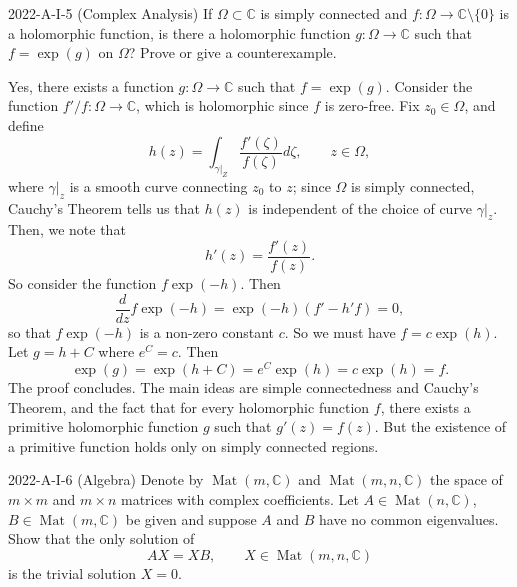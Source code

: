 \documentclass{article}
\begin{document}
\begin{prb}{2022-A-I-5 (Complex Analysis)}
	If $\Omega \subset \mathbb{C}$ is simply connected and $f: \Omega \to \mathbb{C}\setminus \{0\}$ is a holomorphic function, is there a holomorphic function $g: \Omega \to \mathbb{C}$ such that $f = \exp(g)$ on $\Omega$? Prove or give a counterexample. 
\end{prb}
\begin{solutions}
	Yes, there exists a function $g: \Omega \to \mathbb{C}$ such that $f = \exp(g)$. Consider the function $f'/f: \Omega \to \mathbb{C}$, which is holomorphic since $f$ is zero-free. Fix $z_{0} \in \Omega$, and define 
		\begin{equation}
			h(z) = \int_{\gamma|_{Z}}\frac{f'(\zeta)}{f(\zeta)}d\zeta, \qquad z \in \Omega, 
		\end{equation}
	where $\gamma|_{z}$ is a smooth curve connecting $z_{0}$ to $z$; since $\Omega$ is simply connected, Cauchy's Theorem tells us that $h(z)$ is independent of the choice of curve $\gamma|_{z}$. Then, we note that 
		\begin{equation}
			h'(z) = \frac{f'(z)}{f(z)}. 
		\end{equation}
	So consider the function $f\exp(-h)$. Then 
		\begin{equation}
			\frac{d}{dz}f\exp(-h) = \exp(-h)(f' - h'f) = 0, 
		\end{equation}
	so that $f\exp(-h)$ is a non-zero constant $c$. So we must have $f = c\exp(h)$. Let $g = h + C$ where $e^{C} = c$. Then 
		\begin{equation}
			\exp(g) = \exp(h + C) = e^{C}\exp(h) = c\exp(h) = f. 
		\end{equation}
	The proof concludes. The main ideas are simple connectedness and Cauchy's Theorem, and the fact that for every holomorphic function $f$, there exists a primitive holomorphic function $g$ such that $g'(z) = f(z)$. But the existence of a primitive function holds only on simply connected regions. 
\end{solutions}
\begin{prb}{2022-A-I-6 (Algebra)}
	Denote by $\operatorname{Mat}(m, \mathbb{C})$ and $\operatorname{Mat}(m,n,\mathbb{C})$ the space of $m\times m$ and $m \times n$ matrices with complex coefficients. Let $A \in \operatorname{Mat}(n, \mathbb{C})$, $B \in \operatorname{Mat}(m, \mathbb{C})$ be given and suppose $A$ and $B$ have no common eigenvalues. Show that the only solution of 
		\begin{equation*}
			AX = XB, \qquad X \in \operatorname{Mat}(m,n, \mathbb{C})
		\end{equation*}
	is the trivial solution $X = 0$. 
\end{prb}
\end{document}
